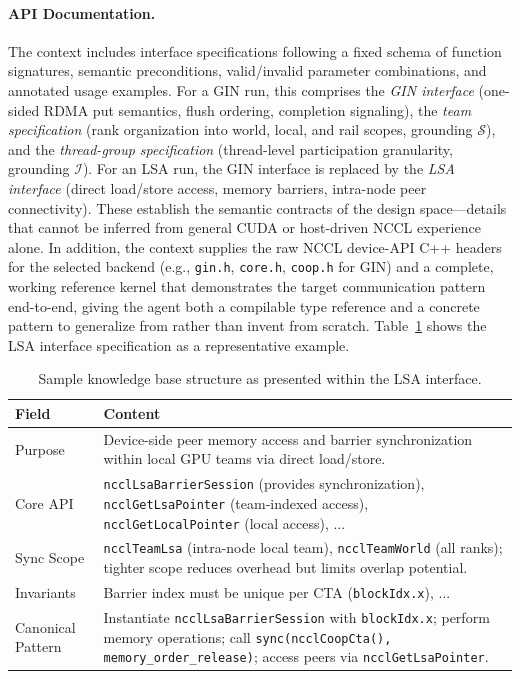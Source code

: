 \paragraph{API Documentation.}
The context includes interface specifications following a fixed schema of function signatures, semantic preconditions, valid/invalid parameter combinations, and annotated usage examples. For a GIN run, this comprises the \emph{GIN interface} (one-sided RDMA put semantics, flush ordering, completion signaling), the \emph{team specification} (rank organization into world, local, and rail scopes, grounding $\mathcal{S}$), and the \emph{thread-group specification} (thread-level participation granularity, grounding $\mathcal{I}$). For an LSA run, the GIN interface is replaced by the \emph{LSA interface} (direct load/store access, memory barriers, intra-node peer connectivity). These establish the semantic contracts of the design space---details that cannot be inferred from general CUDA or host-driven NCCL experience alone. In addition, the context supplies the raw NCCL device-API C++ headers for the selected backend (e.g., \texttt{gin.h}, \texttt{core.h}, \texttt{coop.h} for GIN) and a complete, working reference kernel that demonstrates the target communication pattern end-to-end, giving the agent both a compilable type reference and a concrete pattern to generalize from rather than invent from scratch. Table~\ref{tab:lsa-example-appendix} shows the LSA interface specification as a representative example.

\begin{table}[h]
\centering
\scriptsize
\caption{Sample knowledge base structure as presented within the LSA interface.}
\label{tab:lsa-example-appendix}
\begin{tabular}{p{} p{}}
\toprule
\textbf{Field} & \textbf{Content} \\
\midrule
Purpose & Device-side peer memory access and barrier synchronization within local GPU teams via direct load/store. \\
Core API & \texttt{ncclLsaBarrierSession} (provides synchronization), \texttt{ncclGetLsaPointer} (team-indexed access), \texttt{ncclGetLocalPointer} (local access), ... \\
Sync Scope & \texttt{ncclTeamLsa} (intra-node local team), \texttt{ncclTeamWorld} (all ranks); tighter scope reduces overhead but limits overlap potential. \\
Invariants & Barrier index must be unique per CTA (\texttt{blockIdx.x}), ... \\
Canonical Pattern & Instantiate \texttt{ncclLsaBarrierSession} with \texttt{blockIdx.x}; perform memory operations; call \texttt{sync(ncclCoopCta(), memory\_order\_release)}; access peers via \texttt{ncclGetLsaPointer}. \\
\bottomrule
\end{tabular}
\end{table}

